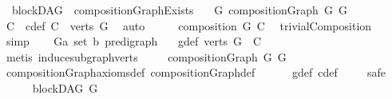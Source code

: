 \begin{isabellebody}
{\isafoldproof}%
%
\isadelimproof
\isanewline
%
\endisadelimproof
\isanewline
{}\isamarkupfalse%
\ {\isacharparenleft}{\kern0pt}\ blockDAG{\isacharparenright}{\kern0pt}\ \ compositionGraphExists{\isacharcolon}{\kern0pt}\isanewline
\ \ \ {\isachardoublequoteopen}{\isasymexists}G{\isacharprime}{\kern0pt}{\isachardot}{\kern0pt}\ compositionGraph\ G\ G{\isacharprime}{\kern0pt}{\isachardoublequoteclose}\isanewline
%
\isadelimproof
%
\endisadelimproof
%
\isatagproof
{}\isamarkupfalse%
\ {\isacharminus}{\kern0pt}\isanewline
\ \ \isamarkupfalse%
\ C\ \ c{\isacharunderscore}{\kern0pt}def{\isacharcolon}{\kern0pt}\ {\isachardoublequoteopen}C\ {\isacharequal}{\kern0pt}\ verts\ G{\isachardoublequoteclose}\ \isamarkupfalse%
\ auto\isanewline
\ \ \isamarkupfalse%
\ \isamarkupfalse%
\ {\isachardoublequoteopen}composition\ G\ C{\isachardoublequoteclose}\ \isamarkupfalse%
\ trivialComposition\ \isamarkupfalse%
\ simp\isanewline
\ \ \isamarkupfalse%
\ G{\isacharprime}{\kern0pt}{\isacharcolon}{\kern0pt}{\isacharcolon}{\kern0pt}{\isachardoublequoteopen}{\isacharparenleft}{\kern0pt}{\isacharprime}{\kern0pt}a\ set{\isacharcomma}{\kern0pt}\ {\isacharprime}{\kern0pt}b{\isacharparenright}{\kern0pt}\ pre{\isacharunderscore}{\kern0pt}digraph{\isachardoublequoteclose}\isanewline
\ \ \ g{\isacharprime}{\kern0pt}{\isacharunderscore}{\kern0pt}def{\isacharcolon}{\kern0pt}\ {\isachardoublequoteopen}verts\ G{\isacharprime}{\kern0pt}\ {\isacharequal}{\kern0pt}\ {\isacharbraceleft}{\kern0pt}C{\isacharbraceright}{\kern0pt}{\isachardoublequoteclose}\isanewline
\ \ \ \ \isamarkupfalse%
\ {\isacharparenleft}{\kern0pt}metis\ induce{\isacharunderscore}{\kern0pt}subgraph{\isacharunderscore}{\kern0pt}verts{\isacharparenright}{\kern0pt}\ \isanewline
\ \ \isamarkupfalse%
\ {\isachardoublequoteopen}compositionGraph\ G\ G{\isacharprime}{\kern0pt}{\isachardoublequoteclose}\ \isamarkupfalse%
\ compositionGraph{\isacharunderscore}{\kern0pt}axioms{\isacharunderscore}{\kern0pt}def\ compositionGraph{\isacharunderscore}{\kern0pt}def\isanewline
\ \ \ \ \ \ g{\isacharprime}{\kern0pt}{\isacharunderscore}{\kern0pt}def\ c{\isacharunderscore}{\kern0pt}def\ \isanewline
\ \ \isamarkupfalse%
\ safe\isanewline
\ \ \ \ \isamarkupfalse%
\ {\isachardoublequoteopen}blockDAG\ G{\isachardoublequoteclose}\ \isamarkupfalse%

\end{isabellebody}
